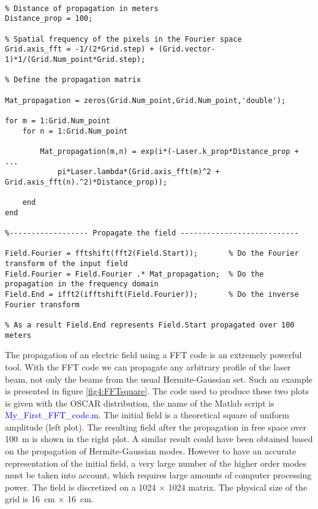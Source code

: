 
\begin{lstlisting}[float=tp,caption=The code used to propagate the matrix Field.Start \label{lis1:start2},frame=lines]

% Distance of propagation in meters
Distance_prop = 100;

% Spatial frequency of the pixels in the Fourier space
Grid.axis_fft = -1/(2*Grid.step) + (Grid.vector-1)*1/(Grid.Num_point*Grid.step);

% Define the propagation matrix

Mat_propagation = zeros(Grid.Num_point,Grid.Num_point,'double');

for m = 1:Grid.Num_point
    for n = 1:Grid.Num_point

        Mat_propagation(m,n) = exp(i*(-Laser.k_prop*Distance_prop + ...
            pi*Laser.lambda*(Grid.axis_fft(m)^2 + Grid.axis_fft(n).^2)*Distance_prop));

    end
end

%------------------ Propagate the field ---------------------------

Field.Fourier = fftshift(fft2(Field.Start));       % Do the Fourier transform of the input field
Field.Fourier = Field.Fourier .* Mat_propagation;  % Do the propagation in the frequency domain
Field.End = ifft2(ifftshift(Field.Fourier));       % Do the inverse Fourier transform

% As a result Field.End represents Field.Start propagated over 100 meters
\end{lstlisting}


The propagation of an electric field using a FFT code is an extremely powerful tool. With the FFT code we can propagate any arbitrary profile of the laser beam, not only the beams from the usual Hermite-Gaussian set. Such an example is presented in figure \ref{fig4:FFTsquare}. The code used to produce these two plots is given with the OSCAR distribution, the name of the Matlab script is \textcolor{blue}{My\_First\_FFT\_code.m}. The initial field is a theoretical square of uniform amplitude (left plot). The resulting field after the propagation in free space over 100~m is shown in the right plot. A similar result could have been obtained based on the propagation of Hermite-Gaussian modes. However to have an accurate representation of the initial field, a very large number of the higher order modes must be taken into account, which requires large amounts of computer processing power. The field is discretized on a 1024 $\times$ 1024 matrix. The physical size of the grid is 16~cm $\times$ 16~cm.\\


